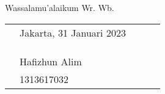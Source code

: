 \vspace{0.5cm}

Wassalamu'alaikum Wr. Wb.

\vspace{3cm}

\begin{flushright}   
	\begin{tabular}{p{7.5cm}llll} 
		& Jakarta, 31 Januari 2023	
		&\\
		&\\
		&\\
		&\\
		& Hafizhun Alim \\
		& 1313617032
	\end{tabular}
\end{flushright}